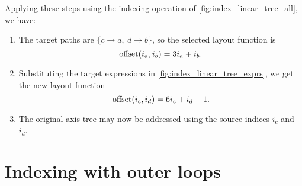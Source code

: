 \documentclass[thesis]{subfiles}
\begin{document}
Applying these steps using the indexing operation of \cref{fig:index_linear_tree_all}, we have:

\begin{enumerate}
  \item
    The target paths are $\{c \to a,\ d \to b\}$, so the selected layout function is
    \begin{equation*}
      \textnormal{offset}(i_a, i_b) = 3 i_a + i_b.
    \end{equation*}
  \item
    Substituting the target expressions in \cref{fig:index_linear_tree_exprs}, we get the new layout function
    \begin{equation*}
      \textnormal{offset}(i_c, i_d) = 6 i_c + i_d + 1.
    \end{equation*}
  \item
    The original axis tree may now be addressed using the source indices $i_c$ and $i_d$.
\end{enumerate}

\section{Indexing with outer loops}
\label{sec:outer_loops}
\end{document}
